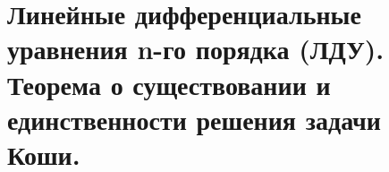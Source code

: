 {
	\section{Линейные дифференциальные уравнения n-го порядка (ЛДУ). Теорема о существовании и единственности
	решения задачи Коши.}

	\newpage
}